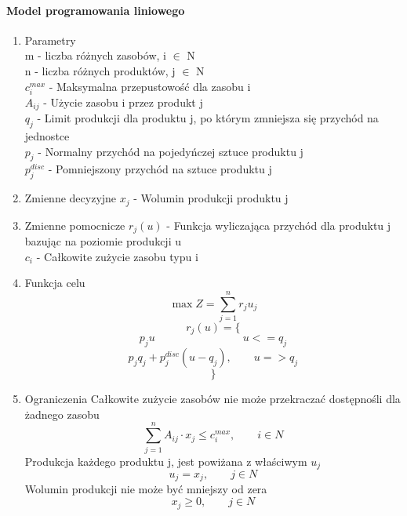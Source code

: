 \documentclass[12pt]{article}
\begin{document}
\paragraph{Model programowania liniowego}
\begin{enumerate}
\item Parametry \\
m - liczba różnych zasobów, i $\in$ N \\ 
n - liczba różnych produktów, j $\in$ N \\
$c_{i}^{max}$ - Maksymalna przepustowość dla zasobu i \\
$A_{ij}$ - Użycie zasobu i przez produkt j \\ 
$q_j$ - Limit produkcji dla produktu j, po którym zmniejsza się przychód na jednostce \\
$p_j$ - Normalny przychód na pojedyńczej sztuce produktu j \\ 
$p_j^{disc}$ - Pomniejszony przychód na sztuce produktu j 

\item Zmienne decyzyjne 
$x_j$ - Wolumin produkcji produktu j 
\item Zmienne pomocnicze 
$r_j(u)$ - Funkcja wyliczająca przychód dla produktu j bazując na poziomie produkcji u \\ 
$c_i$ - Całkowite zużycie zasobu typu i 

\item Funkcja celu 
\[ \max Z = \sum_{j=1}^n r_j u_j \] 
\[ r_j(u) = \{ \]
\[    p_{j} u \qquad \qquad \qquad \qquad u <= q_j  \]
\[    p_j q_j + p_{j}^{disc}(u-q_j), \qquad u => q_j \]
\[ \} \]

\item Ograniczenia 
\setcounter{equation}{0}
Całkowite zużycie zasobów nie może przekraczać dostępnośli dla żadnego zasobu
\begin{equation}
\sum_{j=1}^n A_{ij} \cdot x_j \leq c_i^{max}, \qquad i \in N
\end{equation}
Produkcja każdego produktu j, jest powiżana z właściwym $u_j$
\begin{equation}
u_j = x_j, \qquad j \in N
\end{equation}
Wolumin produkcji nie może być mniejszy od zera
\begin{equation}
x_j \geq 0, \qquad j \in N
\end{equation}


\end{enumerate}
\end{document}
